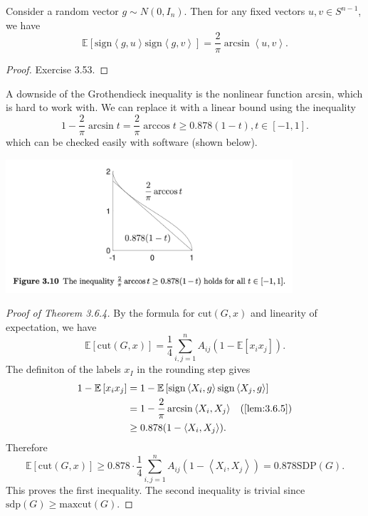 \begin{lemma}
\label{lem:3.6.5}
Consider a random vector $g \sim N(0, I_n)$. Then for any fixed vectors $u, v \in S^{n - 1}$, we have 
\[ \mathbb{E}\left[ \mathrm{sign}\left\langle g, u \right\rangle \mathrm{sign}\left\langle g, v 
\right\rangle \right] = \frac{2}{\pi} \arcsin{\left\langle u, v \right\rangle}. \]
\end{lemma}

\begin{proof}
Exercise 3.53.
\end{proof}

A downside of the Grothendieck inequality is the nonlinear function arcsin, which is hard to work with. We can 
replace it with a linear bound using the inequality 
\[ 1 - \frac{2}{\pi}\arcsin{t} = \frac{2}{\pi} \arccos{t} \geq 0.878(1 - t), t \in [-1, 1]. \]
which can be checked easily with software (shown below).

\begin{center}
	\includegraphics[width=0.8\textwidth]{Chapter 3/fig3-10.png}
\end{center}

\begin{proof}[Proof of Theorem 3.6.4]
By the formula for $\mathrm{cut}(G, x)$ and linearity of expectation, we have 
\[ \mathbb{E}\left[ \mathrm{cut}(G, x) \right] = \frac{1}{4}\sum_{i, j = 1}^{n}
A_{ij}(1 - \mathbb{E}\left[ x_ix_j \right]). \]
The definiton of the labels $x_I$ in the rounding step gives 
\begin{align*}
	1 - \mathbb{E}\left[ x_ix_j \right] 
	&= 1 - \mathbb{E}\left[ \mathrm{sign}\left\langle X_i, g \right\rangle 
	\mathrm{sign}\left\langle X_j, g \right\rangle \right] \\
	&= 1 - \frac{2}{\pi}\arcsin{\left\langle X_i, X_j \right\rangle} \quad \text{(\cref{lem:3.6.5})} \\
	&\geq 0.878(1 - \left\langle X_i, X_j \right\rangle).
\end{align*}
Therefore 
\[ \mathbb{E}\left[ \mathrm{cut}(G, x) \right] 
\geq 0.878 \cdot \frac{1}{4} \sum_{i, j = 1}^{n} A_{ij}(1 - \left\langle X_i, X_j \right\rangle) 
= 0.878 \mathrm{SDP}(G). \]
This proves the first inequality. The second inequality is trivial since $\mathrm{sdp}(G) 
\geq \mathrm{maxcut}(G)$.
\end{proof}



